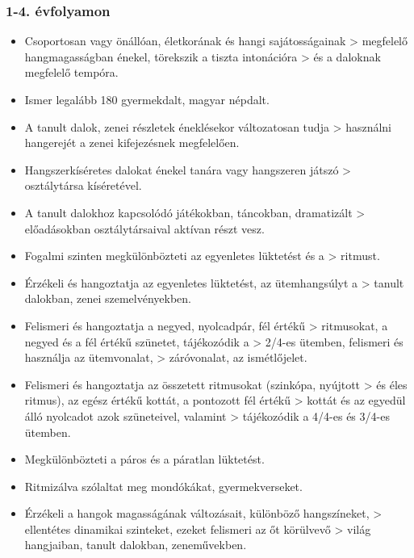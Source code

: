 \hypertarget{evfolyamon-11}{%
\subsubsection{1-4. évfolyamon}\label{evfolyamon-11}}

\begin{itemize}
\item
  Csoportosan vagy önállóan, életkorának és hangi sajátosságainak
  \textgreater{} megfelelő hangmagasságban énekel, törekszik a tiszta
  intonációra \textgreater{} és a daloknak megfelelő tempóra.
\item
  Ismer legalább 180 gyermekdalt, magyar népdalt.
\item
  A tanult dalok, zenei részletek éneklésekor változatosan tudja
  \textgreater{} használni hangerejét a zenei kifejezésnek megfelelően.
\item
  Hangszerkíséretes dalokat énekel tanára vagy hangszeren játszó
  \textgreater{} osztálytársa kíséretével.
\item
  A tanult dalokhoz kapcsolódó játékokban, táncokban, dramatizált
  \textgreater{} előadásokban osztálytársaival aktívan részt vesz.
\item
  Fogalmi szinten megkülönbözteti az egyenletes lüktetést és a
  \textgreater{} ritmust.
\item
  Érzékeli és hangoztatja az egyenletes lüktetést, az ütemhangsúlyt a
  \textgreater{} tanult dalokban, zenei szemelvényekben.
\item
  Felismeri és hangoztatja a negyed, nyolcadpár, fél értékű
  \textgreater{} ritmusokat, a negyed és a fél értékű szünetet,
  tájékozódik a \textgreater{} 2/4-es ütemben, felismeri és használja az
  ütemvonalat, \textgreater{} záróvonalat, az ismétlőjelet.
\item
  Felismeri és hangoztatja az összetett ritmusokat (szinkópa, nyújtott
  \textgreater{} és éles ritmus), az egész értékű kottát, a pontozott
  fél értékű \textgreater{} kottát és az egyedül álló nyolcadot azok
  szüneteivel, valamint \textgreater{} tájékozódik a 4/4-es és 3/4-es
  ütemben.
\item
  Megkülönbözteti a páros és a páratlan lüktetést.
\item
  Ritmizálva szólaltat meg mondókákat, gyermekverseket.
\item
  Érzékeli a hangok magasságának változásait, különböző hangszíneket,
  \textgreater{} ellentétes dinamikai szinteket, ezeket felismeri az őt
  körülvevő \textgreater{} világ hangjaiban, tanult dalokban,
  zeneművekben.

\end{itemize}
